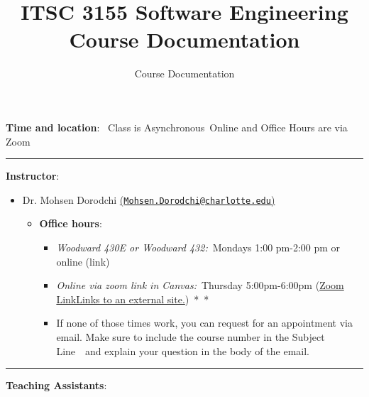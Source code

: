 \documentclass[
]{article}
\title{ITSC 3155 Software Engineering Course Documentation}
\author{Course Documentation}
\date{}
\providecommand{\tightlist}{%
  \setlength{\itemsep}{0pt}\setlength{\parskip}{0pt}}
\begin{document}
\maketitle

\textbf{Time and location}:~ Class is Asynchronous~Online and Office
Hours are via Zoom

\begin{center}\rule{0.5\linewidth}{0.5pt}\end{center}

\textbf{Instructor}:

\begin{itemize}
\tightlist
\item
  Dr. Mohsen Dorodchi
  \href{mailto:(Mohsen.Dorodchi@charlotte.edu)}{(\href{mailto:Mohsen.Dorodchi@charlotte.edu}{\nolinkurl{Mohsen.Dorodchi@charlotte.edu}})}

  \begin{itemize}
  \tightlist
  \item
    \textbf{Office hours}:

    \begin{itemize}
    \tightlist
    \item
      \emph{Woodward 430E or Woodward 432:}~Mondays 1:00 pm-2:00 pm or
      online (link)
    \item
      \emph{Online via zoom link in Canvas:}~Thursday 5:00pm-6:00pm
      (\href{https://charlotte-edu.zoom.us/j/98016945403}{Zoom LinkLinks
      to an external site.})~*~*
    \item
      If none of those times work, you can request for an appointment
      via email. Make sure to include the course number in the Subject
      Line~~and explain your question in the body of the email.
    \end{itemize}
  \end{itemize}
\end{itemize}

\begin{center}\rule{0.5\linewidth}{0.5pt}\end{center}

\textbf{Teaching Assistants}:
\end{document}
